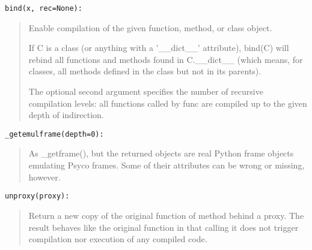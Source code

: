 \documentclass[10pt,english]{article}
\begin{document}
\texttt{bind(x, rec=None):}
\begin{quote}

Enable compilation of the given function, method, or class object.

If C is a class (or anything with a '{\_}{\_}dict{\_}{\_}' attribute), bind(C) will
rebind all functions and methods found in C.{\_}{\_}dict{\_}{\_} (which means, for
classes, all methods defined in the class but not in its parents).

The optional second argument specifies the number of recursive
compilation levels: all functions called by func are compiled
up to the given depth of indirection.
\end{quote}

\texttt{{\_}getemulframe(depth=0):}
\begin{quote}

As {\_}getframe(), but the returned objects are real Python frame objects
emulating Psyco frames. Some of their attributes can be wrong or missing,
however.
\end{quote}

\texttt{unproxy(proxy):}
\begin{quote}

Return a new copy of the original function of method behind a proxy.
The result behaves like the original function in that calling it
does not trigger compilation nor execution of any compiled code.
\end{quote}
\end{document}

